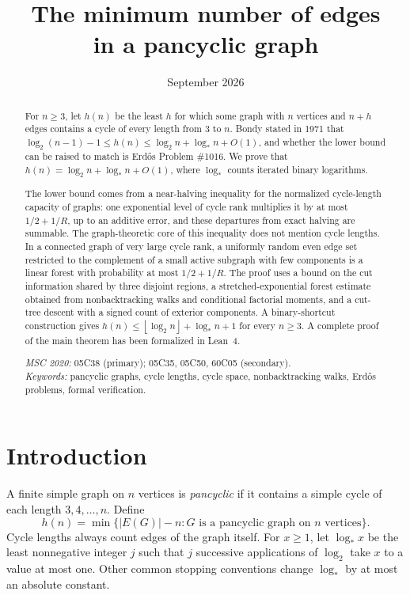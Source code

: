 \documentclass[11pt,a4paper]{article}
\title{\LARGE\bfseries The minimum number of edges\\[4pt] in a pancyclic graph}
\author{\paperauthors}
\date{September 2026}
\numberwithin{equation}{section}
\theoremstyle{definition}
\theoremstyle{remark}
\newcommand{\lstar}{\log_*}
\newcommand{\floor}[1]{\left\lfloor#1\right\rfloor}
\begin{document}
\maketitle
\begin{abstract}
For $n\ge3$, let $h(n)$ be the least $h$ for which some graph with $n$ vertices and $n+h$ edges contains a cycle of every length from $3$ to $n$. Bondy stated in 1971 that $\log_2(n-1)-1\le h(n)\le\log_2n+\log_*n+O(1)$, and whether the lower bound can be raised to match is Erd\H{o}s Problem \#1016. We prove that $h(n)=\log_2 n+\log_*n+O(1)$, where $\log_*$ counts iterated binary logarithms.

The lower bound comes from a near-halving inequality for the normalized cycle-length capacity of graphs: one exponential level of cycle rank multiplies it by at most $1/2+1/R$, up to an additive error, and these departures from exact halving are summable. The graph-theoretic core of this inequality does not mention cycle lengths. In a connected graph of very large cycle rank, a uniformly random even edge set restricted to the complement of a small active subgraph with few components is a linear forest with probability at most $1/2+1/R$. The proof uses a bound on the cut information shared by three disjoint regions, a stretched-exponential forest estimate obtained from nonbacktracking walks and conditional factorial moments, and a cut-tree descent with a signed count of exterior components. A binary-shortcut construction gives $h(n)\le\floor{\log_2n}+\log_*n+1$ for every $n\ge3$. A complete proof of the main theorem has been formalized in Lean~4.

\medskip
\noindent\textit{MSC 2020:} 05C38 (primary); 05C35, 05C50, 60C05 (secondary).\\
\textit{Keywords:} pancyclic graphs, cycle lengths, cycle space, nonbacktracking walks, Erd\H{o}s problems, formal verification.
\end{abstract}
\newpage
\setcounter{tocdepth}{2}
{\linespread{1}\selectfont\tableofcontents}
\newpage
\section{Introduction}\label{sec:intro}
A finite simple graph on $n$ vertices is \emph{pancyclic} if it contains a simple cycle of each length $3,4,\ldots,n$. Define
\[
 h(n)=\min\{|E(G)|-n:G\text{ is a pancyclic graph on }n\text{ vertices}\}.
\]
Cycle lengths always count edges of the graph itself. For $x\ge1$, let $\lstar x$ be the least nonnegative integer $j$ such that $j$ successive applications of $\log_2$ take $x$ to a value at most one. Other common stopping conventions change $\lstar$ by at most an absolute constant.
\end{document}

